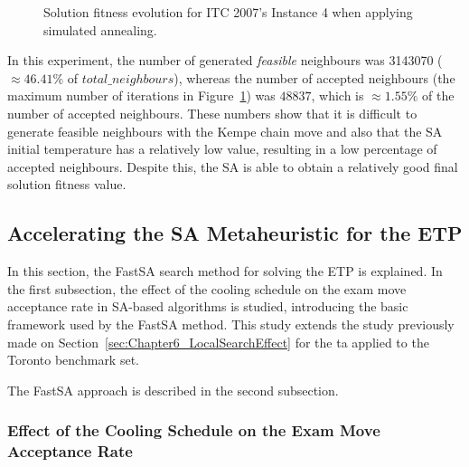 \begin{figure}[H]
	\centering
	\hspace*{-1em}
	
	\caption{Solution fitness evolution for ITC 2007's Instance 4 when applying simulated annealing.} 
	\label{fig:SimulatedAnnealingPlot}
\end{figure}


In this experiment, the number of generated \textit{feasible} neighbours was \num{3143070} ($\approx 46.41\%$ of $total\_neighbours$), whereas the number of accepted neighbours (the maximum number of iterations in Figure~\ref{fig:SimulatedAnnealingPlot}) was $\num{48837}$, which is  $\approx 1.55\%$ of the number of accepted neighbours. These numbers show that it is difficult to generate feasible neighbours with the Kempe chain move and also that the SA initial temperature has a relatively low value, resulting in a low percentage of accepted neighbours. Despite this, the SA is able to obtain a relatively good final solution fitness value.






\subsection{Accelerating the SA Metaheuristic for the ETP}
\label{subsubsec:FastSA}

In this section, the FastSA search method for solving the ETP is explained. In the first subsection, the effect of the cooling schedule on the exam move acceptance rate in SA-based algorithms is studied, introducing the basic framework used by the FastSA method. This study extends the study previously made on Section~\ref{sec:Chapter6_LocalSearchEffect} for the \gls{ta} applied to the Toronto benchmark set. 

The FastSA approach is described in the second subsection. 


\subsubsection{Effect of the Cooling Schedule on the Exam Move Acceptance Rate}
\label{subsubsec:LocalSearchEffect}


